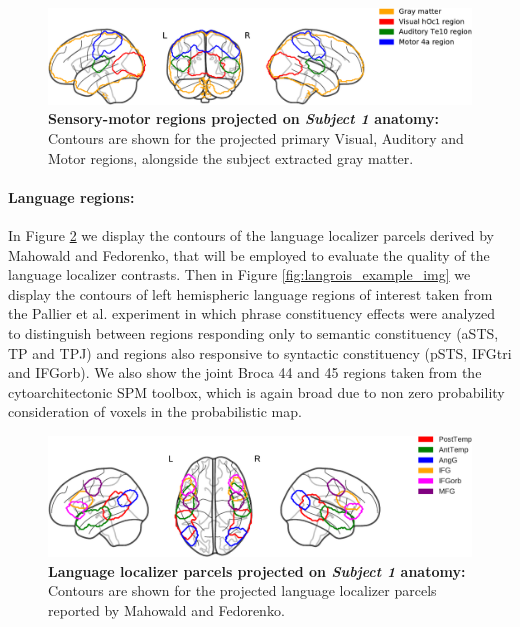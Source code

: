 \begin{figure}[hptb]
\centering
\includegraphics[width=1.0 \linewidth]{figures/part_II/sensory_example_img_with_legend.pdf}
\caption{\textbf{Sensory-motor regions projected on \emph{Subject 1} anatomy:}
Contours are shown for the projected primary Visual, Auditory and Motor regions, alongside the subject extracted gray matter.
}
\label{fig:sensory_example_img}
\end{figure}


\paragraph{Language regions:}
In Figure \ref{fig:fedorenko_example_img} we display the contours of the language localizer parcels derived by Mahowald and Fedorenko\citep{mahowald2016reliable}, that will be employed to evaluate the quality of the language localizer contrasts.
Then in Figure \ref{fig:langrois_example_img} we display the contours of left hemispheric language regions of interest taken from the Pallier et al. experiment in which phrase constituency effects were analyzed to distinguish between regions responding only to semantic constituency (aSTS, TP and TPJ) and regions also responsive to syntactic constituency (pSTS, IFGtri and IFGorb)\citep{pallier2011cortical}.
We also show the joint Broca 44 and 45 regions taken from the cytoarchitectonic SPM toolbox\citep{eickhoff2005new}, which is again broad due to non zero probability consideration of voxels in the probabilistic map.


\begin{figure}[hptb]
\centering
\includegraphics[width=1.0 \linewidth]{figures/part_II/fedorenko_example_img_with_legend.pdf}
\caption{\textbf{Language localizer parcels projected on \emph{Subject 1} anatomy:}
Contours are shown for the projected language localizer parcels reported by Mahowald and Fedorenko.
}
\label{fig:fedorenko_example_img}
\end{figure}


